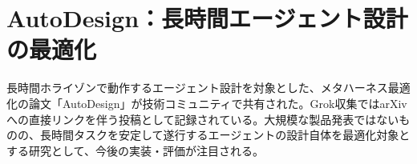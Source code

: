 \section{AutoDesign：長時間エージェント設計の最適化}
長時間ホライゾンで動作するエージェント設計を対象とした、メタハーネス最適化の論文「AutoDesign」が技術コミュニティで共有された。Grok収集ではarXivへの直接リンクを伴う投稿として記録されている。大規模な製品発表ではないものの、長時間タスクを安定して遂行するエージェントの設計自体を最適化対象とする研究として、今後の実装・評価が注目される。
